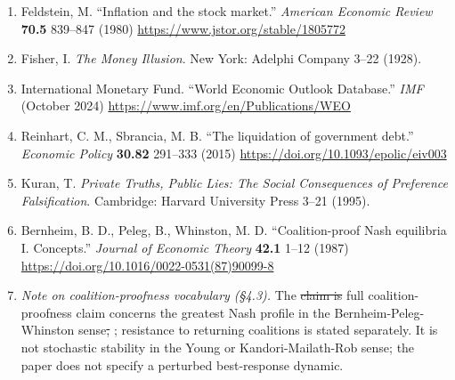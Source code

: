 \documentclass[12pt]{article}
\theoremstyle{definition}
\theoremstyle{remark}
\providecommand{\DIFaddtex}[1]{{\color{AddedText}#1}}
\providecommand{\DIFdeltex}[1]{{\color{DeletedText}\sout{#1}}}
\providecommand{\DIFaddbegin}{}
\providecommand{\DIFaddend}{}
\providecommand{\DIFdelbegin}{}
\providecommand{\DIFdelend}{}
\providecommand{\DIFadd}[1]{\texorpdfstring{\DIFaddtex{#1}}{#1}} %
\providecommand{\DIFdel}[1]{\texorpdfstring{\DIFdeltex{#1}}{}} %
\begin{document}
\begin{enumerate}[leftmargin=*,labelsep=0.5em,label=\arabic*.]
\item Feldstein, M. ``Inflation and the stock market.''
\emph{American Economic Review} \textbf{70.5} 839--847 (1980)
\url{https://www.jstor.org/stable/1805772}

\item Fisher, I. \emph{The Money Illusion}. New York: Adelphi
Company 3--22 (1928).

\item International Monetary Fund. ``World Economic Outlook
Database.'' \emph{IMF} (October 2024)
\url{https://www.imf.org/en/Publications/WEO}

\item Reinhart, C. M., Sbrancia, M. B. ``The liquidation of
government debt.'' \emph{Economic Policy} \textbf{30.82}
291--333 (2015) \url{https://doi.org/10.1093/epolic/eiv003}

\item Kuran, T. \emph{Private Truths, Public Lies: The Social
Consequences of Preference Falsification}. Cambridge: Harvard
University Press 3--21 (1995).

\item Bernheim, B. D., Peleg, B., Whinston, M. D.
``Coalition-proof Nash equilibria I. Concepts.'' \emph{Journal of
Economic Theory} \textbf{42.1} 1--12 (1987)
\url{https://doi.org/10.1016/0022-0531(87)90099-8}

\item \emph{Note on coalition-proofness vocabulary (\S4.3).} The \DIFdelbegin \DIFdel{claim is }\DIFdelend \DIFaddbegin \DIFadd{full }\DIFaddend coalition-proofness \DIFaddbegin \DIFadd{claim concerns the greatest Nash profile }\DIFaddend in the Bernheim-Peleg-Whinston sense\DIFdelbegin \DIFdel{, }\DIFdelend \DIFaddbegin \DIFadd{; resistance to returning coalitions is stated separately. It is }\DIFaddend not stochastic stability in the Young or Kandori-Mailath-Rob sense; the paper does not specify a perturbed best-response dynamic.

\end{enumerate}
\end{document}
